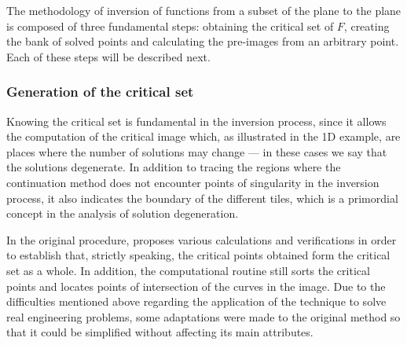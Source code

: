 \documentclass[journal=iecred,manuscript=article]{achemso}
\theoremstyle{definition}
\theoremstyle{remark}
\begin{document}


The methodology of inversion of functions from
a subset of the plane to the plane is composed of three 
fundamental steps: obtaining the critical set of $ F $, 
creating the bank of solved points and calculating the pre-images from an arbitrary point. Each of these steps will be described next.

\subsubsection{Generation of the critical set}

Knowing the critical set is fundamental in the inversion process, since it 
allows the computation of the critical image which, as
illustrated in the 1D example, are places where the number
of solutions may change --- in these cases we say that the solutions degenerate.
 In addition to tracing the regions where the continuation method does not encounter points of singularity in the inversion process, it also indicates the boundary
 of the  different tiles, which is a primordial concept in the analysis of solution degeneration. 

In the original procedure, \citet{malta} proposes various calculations and verifications in order to establish that, strictly speaking, the critical points obtained form the critical set as a whole. In addition, the computational routine still sorts the critical points and locates points of intersection of the curves in the image. Due to the difficulties mentioned above regarding the application of the technique to solve real engineering problems, some adaptations were made to the original method so that it could be simplified without affecting its main attributes.
\end{document}
